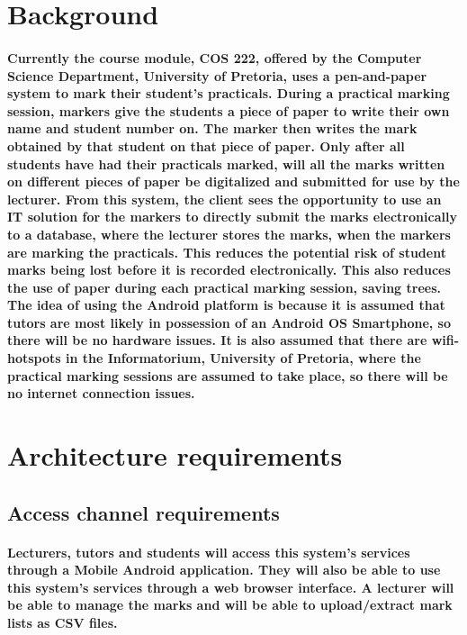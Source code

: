 \documentclass[12pt]{article}
\begin{document}
  \section{Background}
  \paragraph*{Currently the course module, COS 222, offered by the Computer Science Department, University of Pretoria, uses a pen-and-paper system to mark their student's practicals. During a practical marking session, markers give the students a piece of paper to write their own name and student number on. The marker then writes the mark obtained by that student on that piece of paper. Only after all students have had their practicals marked, will all the marks written on different pieces of paper be digitalized and submitted for use by the lecturer. From this system, the client sees the opportunity to use an IT solution for the markers to directly submit the marks electronically to a database, where the lecturer stores the marks, when the markers are marking the practicals. This reduces the potential risk of student marks being lost before it is recorded electronically. This also reduces the use of paper during each practical marking session, saving trees. The idea of using the Android platform is because it is assumed that tutors are most likely in possession of an Android OS Smartphone, so there will be no hardware issues. It is also assumed that there are wifi-hotspots in the Informatorium, University of Pretoria, where the practical marking sessions are assumed to take place, so there will be no internet connection issues.}
  \section{Architecture requirements}
  \subsection{Access channel requirements}
  \paragraph*{Lecturers, tutors and students will access this system's services through a Mobile Android application. They will also be able to use this system's services through a web browser interface. A lecturer will be able to manage the marks and will be able to upload/extract mark lists as CSV files.}
\end{document}

